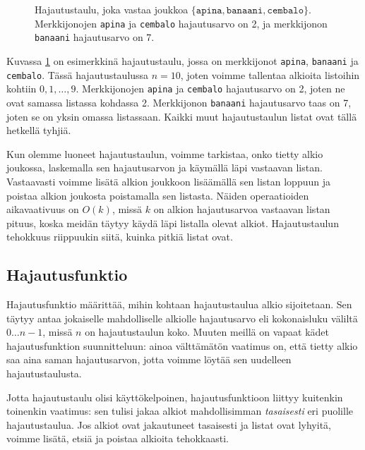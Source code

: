 \begin{figure}
\caption{Hajautustaulu, joka vastaa joukkoa $\{\texttt{apina},\texttt{banaani},\texttt{cembalo}\}$.
Merkkijonojen \texttt{apina} ja \texttt{cembalo} hajautusarvo on 2, ja merkkijonon
\texttt{banaani} hajautusarvo on 7.}
\label{fig:hajtau}
\end{figure}

Kuvassa \ref{fig:hajtau} on esimerkkinä hajautustaulu, jossa on
merkkijonot \texttt{apina}, \texttt{banaani} ja \texttt{cembalo}.
Tässä hajautustaulussa $n=10$, joten voimme tallentaa alkioita
listoihin kohtiin $0,1,\dots,9$.
Merkkijonojen \texttt{apina} ja \texttt{cembalo}
hajautusarvo on 2, joten ne ovat samassa listassa kohdassa 2.
Merkkijonon \texttt{banaani} hajautusarvo taas on 7,
joten se on yksin omassa listassaan.
Kaikki muut hajautustaulun listat ovat tällä hetkellä tyhjiä.

Kun olemme luoneet hajautustaulun, voimme tarkistaa,
onko tietty alkio joukossa, laskemalla sen hajautusarvon
ja käymällä läpi vastaavan listan.
Vastaavasti voimme lisätä alkion joukkoon
lisäämällä sen listan loppuun ja poistaa
alkion joukosta poistamalla sen listasta.
Näiden operaatioiden aikavaativuus on $O(k)$,
missä $k$ on alkion hajautusarvoa vastaavan listan pituus,
koska meidän täytyy käydä läpi listalla olevat alkiot.
Hajautustaulun tehokkuus riippuukin siitä,
kuinka pitkiä listat ovat.

\subsection{Hajautusfunktio}

Hajautusfunktio määrittää, mihin kohtaan hajautustaulua
alkio sijoitetaan.
Sen täytyy antaa jokaiselle mahdolliselle alkiolle
hajautusarvo eli kokonaisluku väliltä $0 \dots n-1$,
missä $n$ on hajautustaulun koko.
Muuten meillä on vapaat kädet hajautusfunktion suunnitteluun:
ainoa välttämätön vaatimus on, että tietty alkio saa aina
saman hajautusarvon, jotta voimme löytää sen uudelleen
hajautustaulusta.

Jotta hajautustaulu olisi käyttökelpoinen, hajautusfunktioon
liittyy kuitenkin toinenkin vaatimus:
sen tulisi jakaa alkiot mahdollisimman \emph{tasaisesti}
eri puolille hajautustaulua.
Jos alkiot ovat jakautuneet tasaisesti ja listat ovat lyhyitä,
voimme lisätä, etsiä ja poistaa alkioita tehokkaasti.

